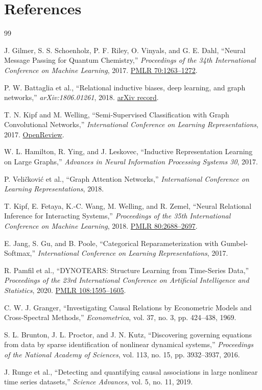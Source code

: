 \documentclass[11pt]{article}
\begin{document}
\section{References}

\begin{thebibliography}{99}

J. Gilmer, S. S. Schoenholz, P. F. Riley, O. Vinyals, and G. E. Dahl,
``Neural Message Passing for Quantum Chemistry,''
\emph{Proceedings of the 34th International Conference on Machine Learning}, 2017.
\href{https://proceedings.mlr.press/v70/gilmer17a.html}{PMLR 70:1263--1272}.

P. W. Battaglia et al.,
``Relational inductive biases, deep learning, and graph networks,''
\emph{arXiv:1806.01261}, 2018.
\href{https://arxiv.org/abs/1806.01261}{arXiv record}.

T. N. Kipf and M. Welling,
``Semi-Supervised Classification with Graph Convolutional Networks,''
\emph{International Conference on Learning Representations}, 2017.
\href{https://openreview.net/forum?id=SJU4ayYgl}{OpenReview}.

W. L. Hamilton, R. Ying, and J. Leskovec,
``Inductive Representation Learning on Large Graphs,''
\emph{Advances in Neural Information Processing Systems 30}, 2017.

P. Veli\v{c}kovi\'c et al.,
``Graph Attention Networks,''
\emph{International Conference on Learning Representations}, 2018.

T. Kipf, E. Fetaya, K.-C. Wang, M. Welling, and R. Zemel,
``Neural Relational Inference for Interacting Systems,''
\emph{Proceedings of the 35th International Conference on Machine Learning}, 2018.
\href{https://proceedings.mlr.press/v80/kipf18a.html}{PMLR 80:2688--2697}.

E. Jang, S. Gu, and B. Poole,
``Categorical Reparameterization with Gumbel-Softmax,''
\emph{International Conference on Learning Representations}, 2017.

R. Pamfil et al.,
``DYNOTEARS: Structure Learning from Time-Series Data,''
\emph{Proceedings of the 23rd International Conference on Artificial Intelligence and Statistics}, 2020.
\href{https://proceedings.mlr.press/v108/pamfil20a.html}{PMLR 108:1595--1605}.

C. W. J. Granger,
``Investigating Causal Relations by Econometric Models and Cross-Spectral Methods,''
\emph{Econometrica}, vol. 37, no. 3, pp. 424--438, 1969.

S. L. Brunton, J. L. Proctor, and J. N. Kutz,
``Discovering governing equations from data by sparse identification of nonlinear dynamical systems,''
\emph{Proceedings of the National Academy of Sciences}, vol. 113, no. 15, pp. 3932--3937, 2016.

J. Runge et al.,
``Detecting and quantifying causal associations in large nonlinear time series datasets,''
\emph{Science Advances}, vol. 5, no. 11, 2019.

\end{thebibliography}
\end{document}
